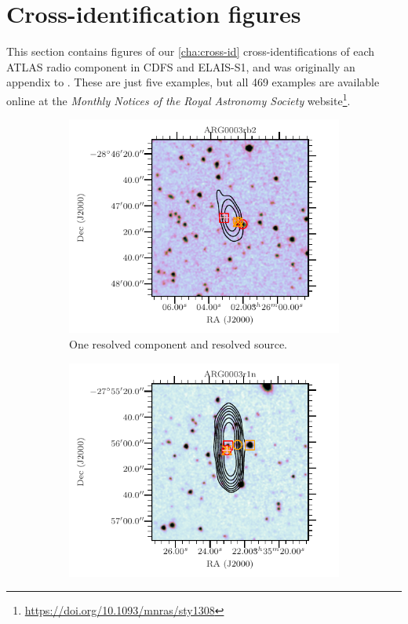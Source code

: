 \section{Cross-identification figures}\label{sec:atlas-xid-examples}

    This section contains figures of our \autoref{cha:cross-id} cross-identifications of each ATLAS radio component in CDFS and ELAIS-S1, and was originally an appendix to \citet{alger18radio}. These are just five examples, but all 469 examples are available online at the \emph{Monthly Notices of the Royal Astronomy Society} website\footnote{\url{https://doi.org/10.1093/mnras/sty1308}}.


    \begin{figure}
        \centering
        \begin{subfigure}{0.45\textwidth}
            \includegraphics[width=\textwidth]{atlas-images/examples_all/example_sorted_2_0.pdf}
            \caption{One resolved component and resolved source.}
        \end{subfigure}
        \begin{subfigure}{0.45\textwidth}
            \includegraphics[width=\textwidth]{atlas-images/examples_all/example_sorted_3_454.pdf}

\end{subfigure}
\end{figure}
